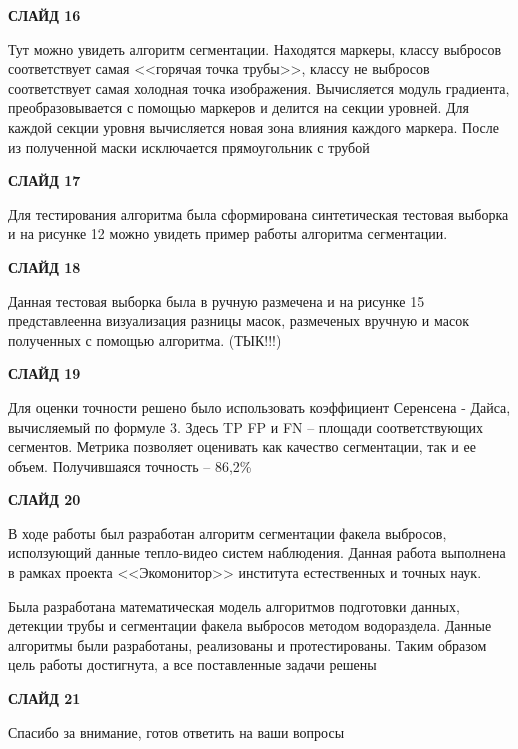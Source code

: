 \documentclass[14pt, a4paper]{extreport}
\begin{document}
	\textbf{СЛАЙД 16}
	 
	Тут можно увидеть алгоритм сегментации. Находятся маркеры, классу выбросов соответствует самая <<горячая точка трубы>>, классу не выбросов соответствует самая холодная точка изображения. Вычисляется модуль градиента, преобразовывается с помощью маркеров и делится на секции уровней. Для каждой секции уровня вычисляется новая зона влияния каждого маркера. После из полученной маски исключается прямоугольник с трубой
	 
	 \textbf{СЛАЙД 17}
	 
	 Для тестирования алгоритма была сформирована синтетическая тестовая выборка и на рисунке 12 можно увидеть пример работы алгоритма сегментации.
	 
	 \textbf{СЛАЙД 18}
	 
	 Данная тестовая выборка была в ручную размечена и на рисунке 15 представлеенна визуализация разницы масок, размеченых вручную и масок полученных с помощью алгоритма. (ТЫК!!!)
	 
	 \textbf{СЛАЙД 19}
	 
	 Для оценки точности решено было использовать коэффициент Серенсена - Дайса, вычисляемый по формуле 3. Здесь TP FP и FN -- площади соответствующих сегментов. Метрика позволяет оценивать как качество сегментации, так и ее объем. Получившаяся точность -- 86,2\%
	 
	 \textbf{СЛАЙД 20}
	 
	 В ходе работы был разработан алгоритм сегментации факела выбросов, исползующий данные тепло-видео систем наблюдения. Данная работа выполнена в рамках проекта <<Экомонитор>> института естественных и точных наук.
	 
	 Была разработана математическая модель алгоритмов подготовки данных, детекции трубы и сегментации факела выбросов методом водораздела. Данные алгоритмы были разработаны, реализованы и протестированы. Таким образом цель работы достигнута, а все поставленные задачи решены
	 
	 \textbf{СЛАЙД 21}
	 
	 Спасибо за внимание, готов ответить на ваши вопросы
\end{document}
